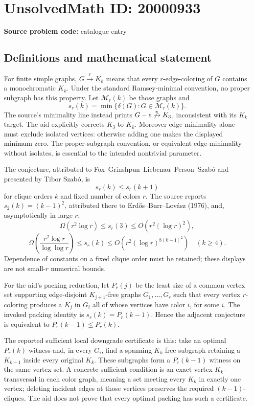 \documentclass[11pt]{article}
\begin{document}
\section*{UnsolvedMath ID: 20000933}
\textbf{Source problem code:} catalogue entry
\subsection{Definitions and mathematical statement}
For finite simple graphs, $G\xrightarrow r K_k$ means that every $r$-edge-coloring of $G$ contains a monochromatic $K_k$. Under the standard Ramsey-minimal convention, no proper subgraph has this property. Let $\mathcal M_r(k)$ be those graphs and
\[
 s_r(k)=\min\{\delta(G):G\in\mathcal M_r(k)\}.
\]
The source's minimality line instead prints $G-e\not\xrightarrow r K_3$, inconsistent with its $K_k$ target. The aid explicitly corrects $K_3$ to $K_k$. Moreover edge-minimality alone must exclude isolated vertices: otherwise adding one makes the displayed minimum zero. The proper-subgraph convention, or equivalent edge-minimality without isolates, is essential to the intended nontrivial parameter.

The conjecture, attributed to Fox--Grinshpun--Liebenau--Person--Szab\'o and presented by Tibor Szab\'o, is
\[
 s_r(k)\leq s_r(k+1)
\]
for clique orders $k$ and fixed number of colors $r$. The source reports $s_2(k)=(k-1)^2$, attributed there to Erd\H os--Burr--Lov\'asz (1976), and, asymptotically in large $r$,
\[
 \Omega(r^2\log r)\leq s_r(3)\leq O(r^2(\log r)^2),
\]
\[
 \Omega\left(\frac{r^2\log r}{\log\log r}\right)\leq s_r(k)
 \leq O\left(r^2(\log r)^{8(k-1)^2}\right)\quad(k\geq4).
\]
Dependence of constants on a fixed clique order must be retained; these displays are not small-$r$ numerical bounds.

For the aid's packing reduction, let $P_r(j)$ be the least size of a common vertex set supporting edge-disjoint $K_{j+1}$-free graphs $G_1,\ldots,G_r$ such that every vertex $r$-coloring produces a $K_j$ in $G_i$ all of whose vertices have color $i$, for some $i$. The invoked packing identity is $s_r(k)=P_r(k-1)$. Hence the adjacent conjecture is equivalent to $P_r(k-1)\leq P_r(k)$.

The reported sufficient local downgrade certificate is this: take an optimal $P_r(k)$ witness and, in every $G_i$, find a spanning $K_k$-free subgraph retaining a $K_{k-1}$ inside every original $K_k$. These subgraphs form a $P_r(k-1)$ witness on the same vertex set. A concrete sufficient condition is an exact vertex $K_k$-transversal in each color graph, meaning a set meeting every $K_k$ in exactly one vertex; deleting incident edges at those vertices preserves the required $(k-1)$-cliques. The aid does not prove that every optimal packing has such a certificate.
\end{document}
